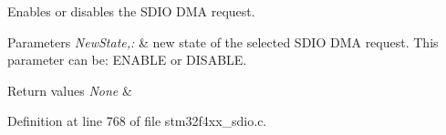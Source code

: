 Enables or disables the S\-D\-I\-O D\-M\-A request. 


\begin{DoxyParams}{Parameters}
{\em New\-State,\-:} & new state of the selected S\-D\-I\-O D\-M\-A request. This parameter can be\-: E\-N\-A\-B\-L\-E or D\-I\-S\-A\-B\-L\-E. \\
\hline
\end{DoxyParams}

\begin{DoxyRetVals}{Return values}
{\em None} & \\
\hline
\end{DoxyRetVals}


Definition at line 768 of file stm32f4xx\-\_\-sdio.\-c.

